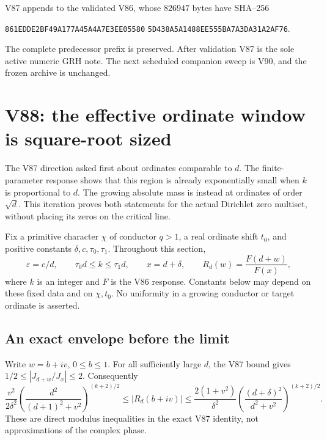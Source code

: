 \documentclass[11pt]{article}
\theoremstyle{definition}
\theoremstyle{remark}
\begin{document}
V87 appends to the validated V86, whose \(826947\) bytes have SHA--256
\begin{center}
\texttt{861EDDE2BF49A177A45A4A7E3EE05580}\allowbreak
\texttt{5D438A5A1488EE555BA7A3DA31A2AF76}.
\end{center}
The complete predecessor prefix is preserved.  After validation V87 is
the sole active numeric GRH note.  The next scheduled companion sweep is
V90, and the frozen archive is unchanged.
\endgroup


\clearpage
\section{V88: the effective ordinate window is square-root sized}
\label{sec:f2v88-ordinate}
\begingroup
\setcounter{equation}{0}
\renewcommand{\theequation}{N88.\arabic{equation}}
\renewcommand{\theHequation}{f2v88.\arabic{equation}}

The V87 direction asked first about ordinates comparable to \(d\).
The finite-parameter response shows that this region is already
exponentially small when \(k\) is proportional to \(d\).  The growing
absolute mass is instead at ordinates of order \(\sqrt d\).  This
iteration proves both statements for the actual Dirichlet zero multiset,
without placing its zeros on the critical line.

Fix a primitive character \(\chi\) of conductor \(q>1\), a real
ordinate shift \(t_0\), and positive constants
\(\delta,c,\tau_0,\tau_1\).  Throughout this section,
\begin{equation}
 \varepsilon=c/d,\qquad \tau_0d\le k\le\tau_1d,
 \qquad x=d+\delta,\qquad
 R_d(w)=\frac{F(d+w)}{F(x)},
 \label{eq:f2v88-regime}
\end{equation}
where \(k\) is an integer and \(F\) is the V86 response.  Constants
below may depend on these fixed data and on \(\chi,t_0\).  No
uniformity in a growing conductor or target ordinate is asserted.

\subsection{An exact envelope before the limit}

Write \(w=b+iv\), \(0\le b\le1\).  For all sufficiently large
\(d\), the V87 bound gives \(1/2\le|J_{d+w}/J_x|\le2\).
Consequently
\begin{equation}
 \frac{v^2}{2\delta^2}
 \left(\frac{d^2}{(d+1)^2+v^2}\right)^{(k+2)/2}
 \le |R_d(b+iv)|\le
 \frac{2(1+v^2)}{\delta^2}
 \left(\frac{(d+\delta)^2}{d^2+v^2}\right)^{(k+2)/2}.
 \label{eq:f2v88-envelope}
\end{equation}
These are direct modulus inequalities in the exact V87 identity, not
approximations of the complex phase.
\end{document}
